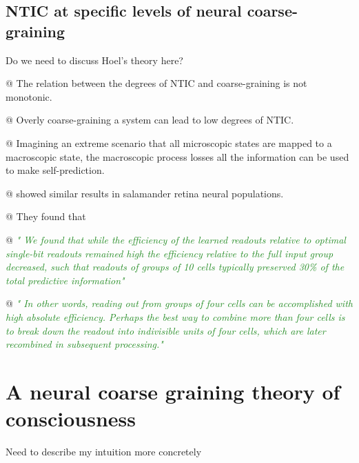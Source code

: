 \documentclass[utf8]{article}
\newenvironment{ants}
			{
			 \begin{easylist}[itemize]		
		 	}
			{
			\end{easylist}
			}
\newcommand{\rewrite}[1]{\textcolor{ForestGreen}{\textit{"#1"}}\newline}
\newcommand{\ideaBox}[1]{
				\begin{tcolorbox}[hyphenationfix, width=12cm, colback=Thistle!50!white, flush right]
					#1
				\end{tcolorbox}
			}
\newcommand{\callforhelp}[1]{\todo[color=SpringGreen]{#1}}
\begin{document}
		\subsection{NTIC at specific levels of neural coarse-graining\callforhelp{any reference?}}
			\ideaBox{Do we need to discuss Hoel's theory here?}
			\begin{ants}
				@ The relation between the degrees of NTIC and coarse-graining is not monotonic.
				
				@ Overly coarse-graining a system can lead to low degrees of NTIC.
				
				@ Imagining an extreme scenario that all microscopic states are mapped to a macroscopic state, the macroscopic process losses all the information can be used to make self-prediction. 
				
				@ \cite{sederberg2018learning} showed similar results in salamander retina neural populations. 
				
				@ They found that 
				
				@ \rewrite{
					We found that while the efficiency of the learned readouts relative to optimal single-bit readouts remained high the efficiency relative to the full input group decreased, such that readouts of groups of 10 cells typically preserved 30\% of the total predictive information}
				
				@ \rewrite{
					In other words, reading out from groups of four cells can be accomplished with high absolute efficiency. Perhaps the best way to combine more than four cells is to break down the readout into indivisible units of four cells, which are later recombined in subsequent processing.}
			\end{ants}
			




			
	\section{A neural coarse graining theory of consciousness}
		\ideaBox{Need to describe my intuition more concretely}
		
\end{document}
